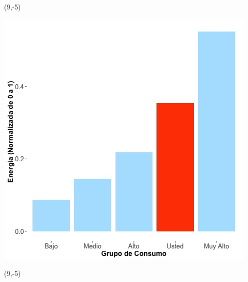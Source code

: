 \documentclass{article}\usepackage[]{graphicx}\usepackage[]{color}
\newenvironment{knitrout}{}{} %
\begin{document}
 \begin{textblock}{1}(9,-5)
\begin{minipage}{20em}
\begingroup

\endgroup
\end{minipage}
\end{textblock}


\begin{knitrout}
\color{fgcolor}
\includegraphics[scale=0.65]{figure/A29_neighbor_plot} 
\end{knitrout}

 \begin{textblock}{1}(9,-5)
\begin{minipage}{20em}
\begingroup

\endgroup
\end{minipage}
\end{textblock}
\end{document}
